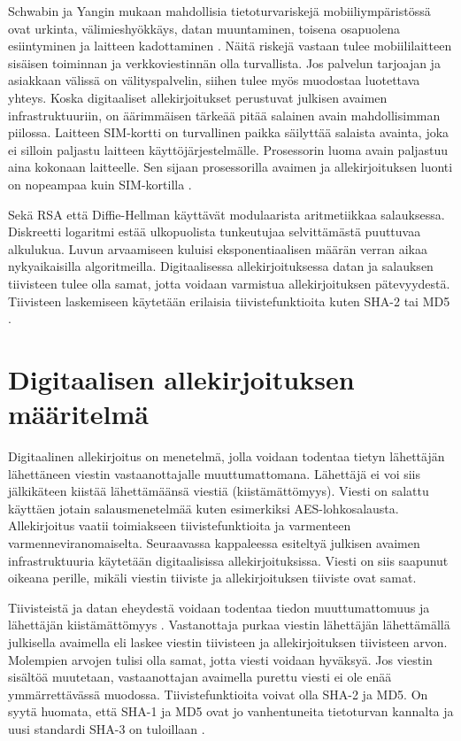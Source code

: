 \documentclass[finnish]{tktltiki2}
\theoremstyle{definition}
\theoremstyle{remark}
\begin{document}
Schwabin ja Yangin mukaan mahdollisia tietoturvariskejä mobiiliympäristössä ovat urkinta, välimieshyökkäys, datan muuntaminen, toisena osapuolena esiintyminen ja laitteen kadottaminen \cite{enti}. Näitä riskejä vastaan tulee mobiililaitteen sisäisen toiminnan ja verkkoviestinnän olla turvallista. Jos palvelun tarjoajan ja asiakkaan välissä on välityspalvelin, siihen tulee myös muodostaa luotettava yhteys. Koska digitaaliset allekirjoitukset perustuvat julkisen avaimen infrastruktuuriin, on äärimmäisen tärkeää pitää salainen avain mahdollisimman piilossa. Laitteen SIM-kortti on turvallinen paikka säilyttää salaista avainta, joka ei silloin paljastu laitteen käyttöjärjestelmälle. Prosessorin luoma avain paljastuu aina kokonaan laitteelle. Sen sijaan prosessorilla avaimen ja allekirjoituksen luonti on nopeampaa kuin SIM-kortilla \cite{proxy}. 

Sekä RSA että Diffie-Hellman käyttävät modulaarista aritmetiikkaa salauksessa. Diskreetti logaritmi estää ulkopuolista tunkeutujaa selvittämästä puuttuvaa alkulukua. Luvun arvaamiseen kuluisi eksponentiaalisen määrän verran aikaa nykyaikaisilla algoritmeilla. Digitaalisessa allekirjoituksessa datan ja salauksen tiivisteen tulee olla samat, jotta voidaan varmistua allekirjoituksen pätevyydestä. Tiivisteen laskemiseen käytetään erilaisia tiivistefunktioita kuten SHA-2 tai MD5 \cite{gene}.         


\section{Digitaalisen allekirjoituksen määritelmä}

Digitaalinen allekirjoitus on menetelmä, jolla voidaan todentaa tietyn lähettäjän lähettäneen viestin vastaanottajalle muuttumattomana. Lähettäjä ei voi siis jälkikäteen kiistää lähettämäänsä viestiä (kiistämättömyys). Viesti on salattu käyttäen jotain salausmenetelmää kuten esimerkiksi AES-lohkosalausta. Allekirjoitus vaatii toimiakseen tiivistefunktioita ja varmenteen varmenneviranomaiselta. Seuraavassa kappaleessa esiteltyä julkisen avaimen infrastruktuuria käytetään digitaalisissa allekirjoituksissa. Viesti on siis saapunut oikeana perille, mikäli viestin tiiviste ja allekirjoituksen tiiviste ovat samat. 

Tiivisteistä ja datan eheydestä voidaan todentaa tiedon muuttumattomuus ja lähettäjän kiistämättömyys \cite{moen}. Vastanottaja purkaa viestin lähettäjän lähettämällä julkisella avaimella eli laskee viestin tiivisteen ja allekirjoituksen tiivisteen arvon. Molempien arvojen tulisi olla samat, jotta viesti voidaan hyväksyä. Jos viestin sisältöä muutetaan, vastaanottajan avaimella purettu viesti ei ole enää ymmärrettävässä muodossa. Tiivistefunktioita voivat olla SHA-2 ja MD5. On syytä huomata, että SHA-1 ja MD5 ovat jo vanhentuneita tietoturvan kannalta ja uusi standardi SHA-3 on tuloillaan \cite{nist}.   
\end{document}
